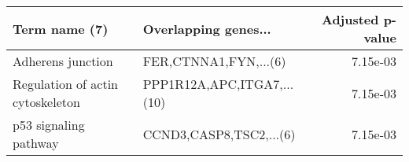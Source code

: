 \begin{tabular}{llr}
\toprule
                   Term name (7) &       Overlapping genes... &  Adjusted p-value \\
\midrule
               Adherens junction &      FER,CTNNA1,FYN,...(6) &          7.15e-03 \\
Regulation of actin cytoskeleton & PPP1R12A,APC,ITGA7,...(10) &          7.15e-03 \\
           p53 signaling pathway &    CCND3,CASP8,TSC2,...(6) &          7.15e-03 \\
\bottomrule
\end{tabular}
